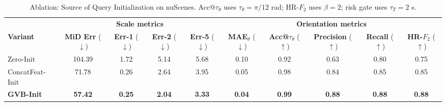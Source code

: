 \documentclass[journal]{IEEEtran}
\begin{document}
\begin{table}[t]
\centering
\caption{Ablation: Source of Query Initialization on nuScenes. Acc@\(\tau_\theta\) uses \(\tau_\theta=\pi/12\) rad; HR-\(F_2\) uses \(\beta=2\); risk gate uses \(\tau_T=2\) s.}
\label{tab:ablation_query}
\setlength{\tabcolsep}{4pt}
\footnotesize
\begin{adjustbox}{width=\textwidth,center}
\begin{tabular}{@{}l cccc ccccc@{}}
\toprule
& \multicolumn{4}{c}{\textbf{Scale metrics}} & \multicolumn{5}{c}{\textbf{Orientation metrics}} \\
\cmidrule(lr){2-5} \cmidrule(lr){6-10}
\textbf{Variant}
& \textbf{MiD Err} (\(\downarrow\))
& \textbf{Err-1} (\(\downarrow\))
& \textbf{Err-2} (\(\downarrow\))
& \textbf{Err-5} (\(\downarrow\))
& \textbf{MAE\(_\theta\)} (\(\downarrow\))
& \textbf{Acc@\(\tau_\theta\)} (\(\uparrow\))
& \textbf{Precision} (\(\uparrow\))
& \textbf{Recall} (\(\uparrow\))
& \textbf{HR-\(F_2\)} (\(\uparrow\)) \\
\midrule
Zero-Init            & 104.39 & 1.72 & 5.14 & 5.68 & 0.10 & 0.92 & 0.63 & 0.80 & 0.75 \\
ConcatFeat-Init     & 71.78  & 0.26 & 2.64 & 3.95 & 0.05 & 0.98 & 0.84 & 0.85 & 0.85 \\
\textbf{GVB-Init}  & \textbf{57.42}  & \textbf{0.25} & \textbf{2.04} & \textbf{3.33} &
\textbf{0.04} & \textbf{0.99} & \textbf{0.88} & \textbf{0.88} & \textbf{0.88} \\
\bottomrule
\end{tabular}
\end{adjustbox}
\end{table}
\end{document}
